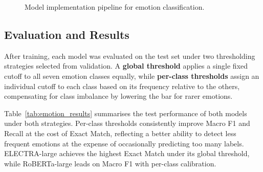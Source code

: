 \begin{figure}[htbp]
\centering
{}
\caption{Model implementation pipeline for emotion classification.}
\label{fig:emotion_model_pipeline}
\end{figure}

\subsection{Evaluation and Results}
\label{sec:emotion_evaluation}

After training, each model was evaluated on the test set under two thresholding strategies selected from validation. A \textbf{global threshold} applies a single fixed cutoff to all seven emotion classes equally, while \textbf{per-class thresholds} assign an individual cutoff to each class based on its frequency relative to the others, compensating for class imbalance by lowering the bar for rarer emotions.

Table~\ref{tab:emotion_results} summarises the test performance of both models under both strategies. Per-class thresholds consistently improve Macro F1 and Recall at the cost of Exact Match, reflecting a better ability to detect less frequent emotions at the expense of occasionally predicting too many labels. ELECTRA-large achieves the highest Exact Match under its global threshold, while RoBERTa-large leads on Macro F1 with per-class calibration.

